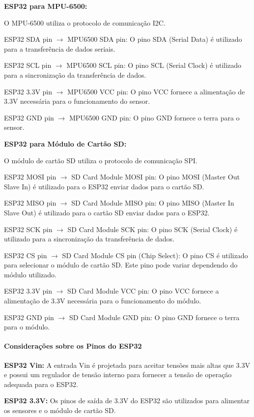 \textbf{ESP32 para MPU-6500:}

O MPU-6500 utiliza o protocolo de comunicação I2C.

ESP32 SDA pin $\rightarrow$ MPU6500 SDA pin: O pino SDA (Serial Data) é utilizado para a transferência de dados seriais.

ESP32 SCL pin $\rightarrow$ MPU6500 SCL pin: O pino SCL (Serial Clock) é utilizado para a sincronização da transferência de dados.

ESP32 3.3V pin $\rightarrow$ MPU6500 VCC pin: O pino VCC fornece a alimentação de 3.3V necessária para o funcionamento do sensor.

ESP32 GND pin $\rightarrow$ MPU6500 GND pin: O pino GND fornece o terra para o sensor.

\textbf{ESP32 para Módulo de Cartão SD:}

O módulo de cartão SD utiliza o protocolo de comunicação SPI.

ESP32 MOSI pin $\rightarrow$ SD Card Module MOSI pin: O pino MOSI (Master Out Slave In) é utilizado para o ESP32 enviar dados para o cartão SD.

ESP32 MISO pin $\rightarrow$ SD Card Module MISO pin: O pino MISO (Master In Slave Out) é utilizado para o cartão SD enviar dados para o ESP32.

ESP32 SCK pin $\rightarrow$ SD Card Module SCK pin: O pino SCK (Serial Clock) é utilizado para a sincronização da transferência de dados.

ESP32 CS pin $\rightarrow$ SD Card Module CS pin (Chip Select): O pino CS é utilizado para selecionar o módulo de cartão SD. Este pino pode variar dependendo do módulo utilizado.

ESP32 3.3V pin $\rightarrow$ SD Card Module VCC pin: O pino VCC fornece a alimentação de 3.3V necessária para o funcionamento do módulo.

ESP32 GND pin $\rightarrow$ SD Card Module GND pin: O pino GND fornece o terra para o módulo.

\paragraph{Considerações sobre os Pinos do ESP32}

\textbf{ESP32 Vin:} A entrada Vin é projetada para aceitar tensões mais altas que 3.3V e possui um regulador de tensão interno para fornecer a tensão de operação adequada para o ESP32.

\textbf{ESP32 3.3V:} Os pinos de saída de 3.3V do ESP32 são utilizados para alimentar os sensores e o módulo de cartão SD.

